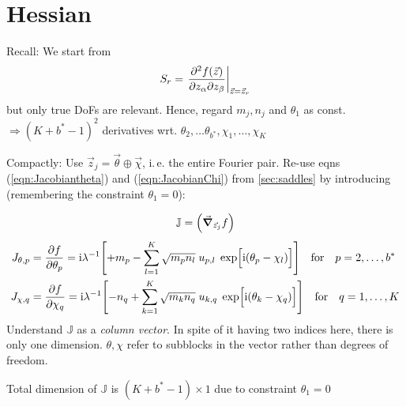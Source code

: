 \documentclass[
	english,
	a4paper,
	fontsize=10pt,
	parskip=half,
	titlepage=true,
	DIV=12,
	final
]{scrreprt}
\newcommand*{\ie}{i.\,e.\xspace}
\newcommand*{\Thus}{\ensuremath{\Rightarrow}\xspace}
\newcommand*{\iunit}{\ensuremath{\mathrm{i}}}
\begin{document}
\section{Hessian}
Recall: We start from
\begin{align}
	S_r
=
	\eval{
		\pdv{f(\vec{z})}%
			{z_\alpha}{z_\beta}
	}_{\vec{z} = \vec{z}_r}
\end{align}
but only true DoFs are relevant. Hence, regard $m_j, n_j$ and $\theta_1$ as const. \\
\Thus $(K + b^* - 1)^{2}$ derivatives wrt. $\theta_2, \ldots \theta_{b^*}, \chi_1, \ldots, \chi_K$

Compactly: Use $\vec{z}_j = \vec{\theta} \oplus \vec{\chi}$, \ie the entire Fourier pair. Re-use eqns (\ref{eqn:Jacobiantheta}) and (\ref{eqn:JacobianChi}) from \ref{sec:saddles} by introducing (remembering the constraint $\theta_1 = 0$):

\begin{align}
	\mathbb{J} = \qty( \grad_{\vec{z}_j} f )
\end{align}
\begin{align}
	J_{\theta, p} 
&= 
	\pdv{f}{\theta_p}
=
	\iunit \lambda^{-1}
	\qty[
		+m_p
		-
		\sum_{l=1}^{K}
			\sqrt{m_p n_l} \; u_{p,l} \; \exp[\Big. \iunit(\theta_p - \chi_l)]
	]
\qfor{} p = 2, \ldots, b^*
\\
	J_{\chi, q} 
&= 
	\pdv{f}{\chi_q}
=
	\iunit \lambda^{-1}
	\qty[
		-n_q
		+
		\sum_{k=1}^{K}
			\sqrt{m_k n_q} \; u_{k,q} \; \exp[\Big. \iunit(\theta_k - \chi_q)]
	]
\qfor{} q = 1, \ldots, K
\end{align}
Understand $\mathbb{J}$ as a \emph{column vector}. In spite of it having two indices here, there is only one dimension. $\theta, \chi$ refer to subblocks in the vector rather than degrees of freedom.

Total dimension of $\mathbb{J}$ is $(K + b^* - 1) \times 1$ due to constraint $\theta_1 = 0$
\end{document}
